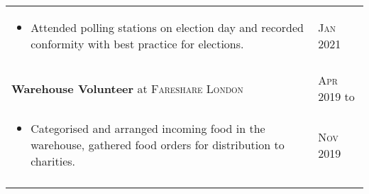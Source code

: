 \documentclass[a4paper,10pt]{article}
\newcommand{\datelen}{1.8cm}
\newcommand{\descrlen}{15.5cm}
\begin{document}
\begin{tabular}{p{\descrlen}|p{\datelen}}
{\begin{itemize}
  \item Attended polling stations on election day and recorded conformity with best practice for elections.
  \vspace{-0.5cm}
  \end{itemize}}&\textsc{Jan 2021}\\\multicolumn{2}{c}{} \\[-0.2cm]
  \textbf{Warehouse Volunteer} at \textsc{Fareshare London} & \textsc{Apr 2019} to\\
  \small{
  \vspace{-0.4cm}
  \begin{itemize}
  \item Categorised and arranged incoming food in the warehouse, gathered food orders for distribution to charities.
  \vspace{-0.5cm}
  \end{itemize}}&\textsc{Nov 2019}\\\multicolumn{2}{c}{} \\[-0.2cm]
\end{tabular}
\end{document}
